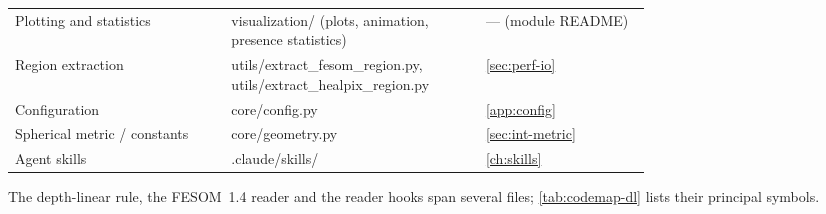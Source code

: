 \begin{longtable}{@{}>{\footnotesize}p{0.34\linewidth} >{\ttfamily\footnotesize\raggedright\arraybackslash}p{0.40\linewidth} >{\footnotesize}l@{}}
Plotting and statistics & visualization/ (plots, animation, presence statistics) & --- (module README) \\
Region extraction & utils/extract\_fesom\_region.py, utils/extract\_healpix\_region.py & \cref{sec:perf-io} \\
Configuration & core/config.py & \cref{app:config} \\
Spherical metric / constants & core/geometry.py & \cref{sec:int-metric} \\
Agent skills & .claude/skills/ & \cref{ch:skills} \\
\bottomrule
\end{longtable}

\noindent The depth-linear rule, the FESOM~1.4 reader and the reader hooks span several files;
\cref{tab:codemap-dl} lists their principal symbols.

